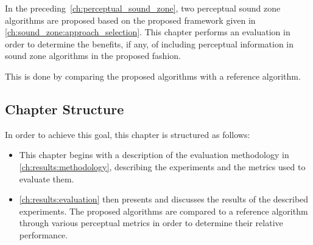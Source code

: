 In the preceding~\autoref{ch:perceptual_sound_zone}, two perceptual sound zone algorithms are proposed based on the proposed framework given in
\autoref{ch:sound_zone:approach_selection}.
This chapter performs an evaluation in order to determine the benefits, if any, of including perceptual information in sound zone algorithms 
in the proposed fashion.

This is done by comparing the proposed algorithms with a reference algorithm.

\subsection*{Chapter Structure}
In order to achieve this goal, this chapter is structured as follows:

\begin{itemize}
    \item This chapter begins with a description of the evaluation methodology in \autoref{ch:results:methodology}, describing the experiments 
        and the metrics used to evaluate them.
    \item \autoref{ch:results:evaluation} then presents and discusses the results of the described experiments. 
        The proposed algorithms are compared to a reference algorithm through various perceptual metrics in order to determine their relative performance.
\end{itemize}
